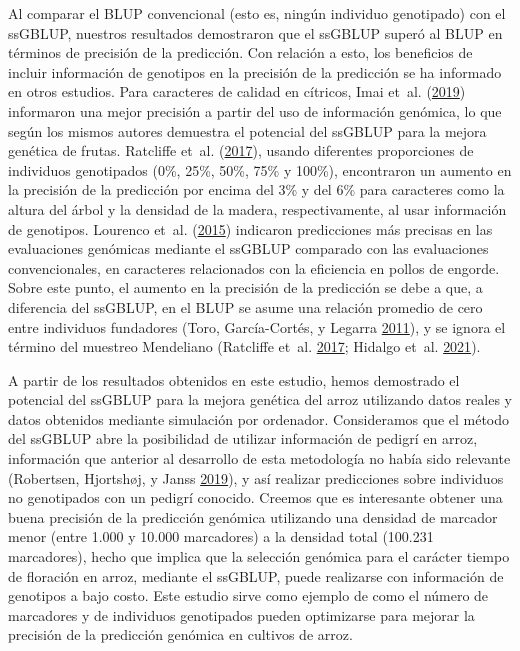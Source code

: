 \documentclass[11pt,spanish,a4paper,oneside,]{book} %
\begin{document}
Al comparar el BLUP convencional (esto es, ningún individuo genotipado) con el ssGBLUP, nuestros resultados demostraron que el ssGBLUP superó al BLUP en términos de precisión de la predicción. Con relación a esto, los beneficios de incluir información de genotipos en la precisión de la predicción se ha informado en otros estudios. Para caracteres de calidad en cítricos, Imai et~al. (\protect\hyperlink{ref-cite:20}{2019}) informaron una mejor precisión a partir del uso de información genómica, lo que según los mismos autores demuestra el potencial del ssGBLUP para la mejora genética de frutas. Ratcliffe et~al. (\protect\hyperlink{ref-cite:72}{2017}), usando diferentes proporciones de individuos genotipados (0\%, 25\%, 50\%, 75\% y 100\%), encontraron un aumento en la precisión de la predicción por encima del 3\% y del 6\% para caracteres como la altura del árbol y la densidad de la madera, respectivamente, al usar información de genotipos. Lourenco et~al. (\protect\hyperlink{ref-cite:87}{2015}) indicaron predicciones más precisas en las evaluaciones genómicas mediante el ssGBLUP comparado con las evaluaciones convencionales, en caracteres relacionados con la eficiencia en pollos de engorde. Sobre este punto, el aumento en la precisión de la predicción se debe a que, a diferencia del ssGBLUP, en el BLUP se asume una relación promedio de cero entre individuos fundadores (Toro, García-Cortés, y Legarra \protect\hyperlink{ref-cite:71}{2011}), y se ignora el término del muestreo Mendeliano (Ratcliffe et~al. \protect\hyperlink{ref-cite:72}{2017}; Hidalgo et~al. \protect\hyperlink{ref-cite:89}{2021}).

A partir de los resultados obtenidos en este estudio, hemos demostrado el potencial del ssGBLUP para la mejora genética del arroz utilizando datos reales y datos obtenidos mediante simulación por ordenador. Consideramos que el método del ssGBLUP abre la posibilidad de utilizar información de pedigrí en arroz, información que anterior al desarrollo de esta metodología no había sido relevante (Robertsen, Hjortshøj, y Janss \protect\hyperlink{ref-cite:63}{2019}), y así realizar predicciones sobre individuos no genotipados con un pedigrí conocido. Creemos que es interesante obtener una buena precisión de la predicción genómica utilizando una densidad de marcador menor (entre 1.000 y 10.000 marcadores) a la densidad total (100.231 marcadores), hecho que implica que la selección genómica para el carácter tiempo de floración en arroz, mediante el ssGBLUP, puede realizarse con información de genotipos a bajo costo. Este estudio sirve como ejemplo de como el número de marcadores y de individuos genotipados pueden optimizarse para mejorar la precisión de la predicción genómica en cultivos de arroz.
\end{document}
